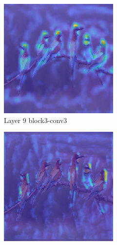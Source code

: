 \begin{figure}
\begin{subfigure}[b]{0.30\textwidth}
         \includegraphics[width=\textwidth]{images/hm-layer-7.png}
         \caption{Layer 9 block3-conv3}
         \label{fig:layer-9}
     \end{subfigure}
     \hspace{1em}%
     \begin{subfigure}[b]{0.30\textwidth}
         \centering
         \includegraphics[width=\textwidth]{images/hm-layer-9.png}

\end{subfigure}
\end{figure}
